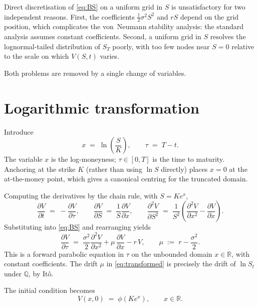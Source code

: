 \documentclass[11pt,a4paper]{article}
\begin{document}
Direct discretisation of \eqref{eq:BS} on a uniform grid in $S$ is
unsatisfactory for two independent reasons. First, the coefficients
$\frac{1}{2}\sigma^2 S^2$ and $rS$ depend on the grid position, which
complicates the von~Neumann stability analysis: the standard analysis
assumes constant coefficients. Second, a uniform grid in $S$ resolves
the lognormal-tailed distribution of $S_T$ poorly, with too few nodes
near $S = 0$ relative to the scale on which $V(S,t)$ varies.

Both problems are removed by a single change of variables.

\section{Logarithmic transformation}\label{sec:logtransform}

Introduce
\begin{equation}
x \;=\; \ln\!\left(\frac{S}{K}\right), \qquad
\tau \;=\; T - t.
\label{eq:transform}
\end{equation}
The variable $x$ is the log-moneyness; $\tau \in [0, T]$ is the time to
maturity. Anchoring at the strike $K$ (rather than using $\ln S$
directly) places $x = 0$ at the at-the-money point, which gives a
canonical centring for the truncated domain.

Computing the derivatives by the chain rule, with $S = K e^x$,
\[
\frac{\partial V}{\partial t} \;=\; -\frac{\partial V}{\partial \tau},
\qquad
\frac{\partial V}{\partial S} \;=\; \frac{1}{S}\frac{\partial V}{\partial x},
\qquad
\frac{\partial^2 V}{\partial S^2}
\;=\; \frac{1}{S^2}\!\left(
  \frac{\partial^2 V}{\partial x^2} - \frac{\partial V}{\partial x}
\right).
\]
Substituting into \eqref{eq:BS} and rearranging yields
\begin{equation}
\boxed{\;
\frac{\partial V}{\partial \tau}
\;=\; \frac{\sigma^2}{2}\frac{\partial^2 V}{\partial x^2}
   + \mu\,\frac{\partial V}{\partial x}
   - r\, V,
\qquad
\mu \;:=\; r - \frac{\sigma^2}{2}.
\;}
\label{eq:transformed}
\end{equation}
This is a forward parabolic equation in $\tau$ on the unbounded domain
$x \in \mathbb{R}$, with constant coefficients. The drift $\mu$ in
\eqref{eq:transformed} is precisely the drift of $\ln S_t$ under
$\mathbb{Q}$, by It\^o.

The initial condition becomes
\[
V(x, 0) \;=\; \phi(K e^x), \qquad x \in \mathbb{R}.
\]
\end{document}
